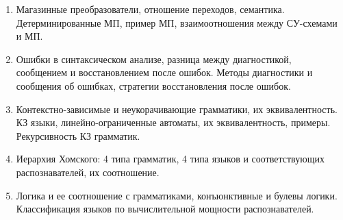 \documentclass[12pt]{article}
\newcommand{\litem}[1]{\item #1 }%
\begin{document}
\begin{enumerate}
  \litem {Магазинные преобразователи, отношение переходов, семантика. Детерминированные МП, пример МП, взаимоотношения между СУ-схемами и МП.}
  \litem {Ошибки в синтаксическом анализе, разница между диагностикой, сообщением и восстановлением после ошибок. Методы диагностики и сообщения об ошибках, стратегии восстановления после ошибок. }
  \litem {Контекстно-зависимые и неукорачивающие грамматики, их эквивалентность. КЗ языки, линейно-ограниченные автоматы, их эквивалентность, примеры. Рекурсивность КЗ грамматик. }
  \litem {Иерархия Хомского: 4 типа грамматик, 4 типа языков и соответствующих распознавателей, их соотношение.}
  \litem {Логика и ее соотношение с грамматиками, конъюнктивные и булевы логики. Классификация языков по вычислительной мощности распознавателей. }
\end{enumerate}
\end{document}
